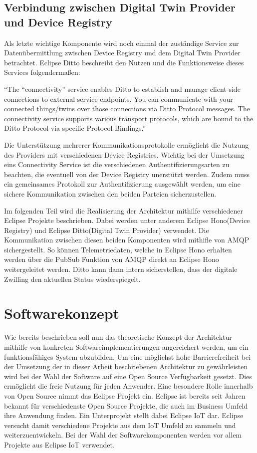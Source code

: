 \subsection{Verbindung zwischen Digital Twin Provider und Device Registry}

Als letzte wichtige Komponente wird noch einmal der zuständige Service zur Datenübermittlung zwischen Device Registry und dem Digital Twin Provider betrachtet. Eclipse Ditto beschreibt den Nutzen und die Funktionsweise dieses Services folgendermaßen:

\enquote{The “connectivity” service enables Ditto to establish and manage client-side connections to external service endpoints. You can communicate with your connected things/twins over those connections via Ditto Protocol messages. The connectivity service supports various transport protocols, which are bound to the Ditto Protocol via specific Protocol Bindings.}\autocite{ditto}

Die Unterstützung mehrerer Kommunikationsprotokolle ermöglicht die Nutzung des Providers mit verschiedenen Device Registries. Wichtig bei der Umsetzung eins Connectivity Service ist die verschiedenen Authentifizierungsarten zu beachten, die eventuell von der Device Registry unerstützt werden. Zudem muss ein gemeinsames Protokoll zur Authentifizierung ausgewählt werden, um eine sichere Kommunikation zwischen den beiden Parteien sicherzustellen.

Im folgenden Teil wird die Realisierung der Architektur mithilfe verschiedener Eclipse Projekte beschrieben. Dabei werden unter anderem Eclipse Hono(Device Registry) und Eclipse Ditto(Digital Twin Provider) verwendet. Die Kommunikation zwischen diesen beiden Komponenten wird mithifle von \ac{AMQP} sichergestellt. So können Telemetriedaten, welche in Eclipse Hono erhalten werden über die PubSub Funktion von AMQP direkt an Eclipse Hono weitergeleitet werden. Ditto kann dann intern sicherstellen, dass der digitale Zwilling den aktuellen Status wiederspiegelt.

\clearpage
\section{Softwarekonzept}

Wie bereits beschrieben soll nun das theoretische Konzept der Architektur mithilfe von konkreten Softwareimplementierungen angereichert werden, um ein funktionsfähiges System abzubilden. Um eine möglichst hohe Barrierefreiheit bei der Umsetzung der in dieser Arbeit beschriebenen Architektur zu gewährleisten wird bei der Wahl der Software auf eine Open Source Verfügbarkeit gesetzt. Dies ermöglicht die freie Nutzung für jeden Anwender. Eine besondere Rolle innerhalb von Open Source nimmt das Eclipse Projekt ein. Eclipse ist bereits seit Jahren bekannt für verschiedenste Open Source Projekte, die auch im Business Umfeld ihre Anwendung finden. Ein Unterprojekt stellt dabei Eclipse IoT dar. Eclipse versucht damit verschiedene Projekte aus dem IoT Umfeld zu sammeln und weiterzuentwickeln. Bei der Wahl der Softwarekomponenten werden vor allem Projekte aus Eclipse IoT verwendet.

